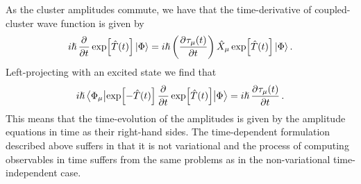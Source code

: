         As the cluster amplitudes commute, we have that the time-derivative of
        coupled-cluster wave function is given by
        \begin{align}
            i\hslash\dpd{}{t}\exp[\clust(t)]\ket{\slat}
            = i\hslash \para{
                \dpd{\clustamp_{\mu}(t)}{t}
            }
            \hat{X}_{\mu}
            \exp[\clust(t)]\ket{\slat}.
        \end{align}
        Left-projecting with an excited state we find that
        \begin{align}
            i\hslash
            \mel{\slat_{\mu}}{
                \exp[-\clust(t)]
                \dpd{}{t}
                \exp[\clust(t)]
            }{\slat}
            =
            i\hslash
            \dpd{\clustamp_{\mu}(t)}{t}.
        \end{align}
        This means that the time-evolution of the amplitudes is given by the
        amplitude equations in time as their right-hand sides.
        The time-dependent formulation described above suffers in that it is not
        variational \cite{tdcc-hoodbhoy, tdcc-hoodbhoy-2, tdcc-huber} and the
        process of computing observables in time suffers from the same problems
        as in the non-variational time-independent case.

